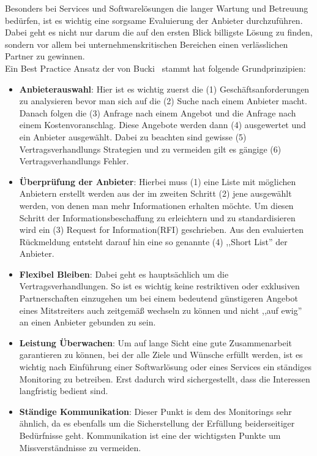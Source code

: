 Besonders bei Services und Softwarel\"osungen die langer Wartung und Betreuung bed\"urfen, ist es wichtig eine sorgsame Evaluierung der Anbieter durchzuf\"uhren. Dabei geht es nicht nur darum die auf den ersten Blick billigste L\"osung zu finden, sondern vor allem bei unternehmenskritischen Bereichen einen verl\"asslichen Partner zu gewinnen.\\
Ein Best Practice Ansatz der von Bucki~\cite{Bucki2013} stammt hat folgende Grundprinzipien:
\begin{itemize}
\item \textbf{Anbieterauswahl}:
Hier ist es wichtig zuerst die (1) Gesch\"aftsanforderungen zu analysieren bevor man sich auf die (2) Suche nach einem Anbieter macht. Danach folgen die (3) Anfrage nach einem Angebot und die Anfrage nach einem Kostenvoranschlag. Diese Angebote werden dann (4) ausgewertet und ein Anbieter ausgew\"ahlt. Dabei zu beachten sind gewisse (5) Vertragsverhandlungs Strategien und zu vermeiden gilt es g\"angige (6) Vertragsverhandlungs Fehler.
\item \textbf{\"Uberpr\"ufung der Anbieter}:
Hierbei muss (1) eine Liste mit m\"oglichen Anbietern erstellt werden aus der im zweiten Schritt (2) jene ausgew\"ahlt werden, von denen man mehr Informationen erhalten m\"ochte. Um diesen Schritt der Informationsbeschaffung zu erleichtern und zu standardisieren wird ein (3) Request for Information(RFI) geschrieben. Aus den evaluierten R\"uckmeldung entsteht darauf hin eine so genannte (4) ,,Short List'' der Anbieter.
\item \textbf{Flexibel Bleiben}:
Dabei geht es haupts\"achlich um die Vertragsverhandlungen. So ist es wichtig keine restriktiven oder exklusiven Partnerschaften einzugehen um bei einem bedeutend g\"unstigeren Angebot eines Mitstreiters auch zeitgem\"a\ss{} wechseln zu k\"onnen und nicht ,,auf ewig'' an einen Anbieter gebunden zu sein.
\item \textbf{Leistung \"Uberwachen}:
Um auf lange Sicht eine gute Zusammenarbeit garantieren zu k\"onnen, bei der alle Ziele und W\"unsche erf\"ullt werden, ist es wichtig nach Einf\"uhrung einer Softwarl\"osung oder eines Services ein st\"andiges Monitoring zu betreiben. Erst dadurch wird sichergestellt, dass die Interessen langfristig bedient sind.
\item \textbf{St\"andige Kommunikation}:
Dieser Punkt is dem des Monitorings sehr \"ahnlich, da es ebenfalls um die Sicherstellung der Erf\"ullung beiderseitiger Bed\"urfnisse geht. Kommunikation ist eine der wichtigsten Punkte um Missverst\"andnisse zu vermeiden.
\end{itemize}